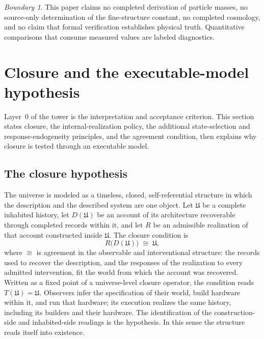 \documentclass[11pt]{article}
\theoremstyle{definition}
\theoremstyle{remark}
\newtheorem{boundary}[theorem]{Boundary}
\begin{document}
\begin{boundary}
This paper claims no completed derivation of particle masses, no source-only
determination of the fine-structure constant, no completed cosmology, and no
claim that formal verification establishes physical truth. Quantitative
comparisons that consume measured values are labeled diagnostics.
\end{boundary}

\section{Closure and the executable-model hypothesis}
\label{sec:strange-loop}

Layer~0 of the tower is the interpretation and acceptance criterion. This
section states closure, the internal-realization policy, the additional
state-selection and response-endogeneity principles, and the agreement
condition, then explains why closure is tested through an executable model.

\subsection{The closure hypothesis}

The universe is modeled as a timeless, closed, self-referential structure in which the description and the described system are one object.
Let $\mathfrak U$ be a complete inhabited history, let $D(\mathfrak U)$ be an
account of its architecture recoverable through completed records within it,
and let $R$ be an admissible realization of that account constructed inside
$\mathfrak U$. The closure condition is
\begin{equation}
R\bigl(D(\mathfrak U)\bigr)\;\cong\;\mathfrak U ,
\label{eq:closure-condition}
\end{equation}
where $\cong$ is agreement in the observable and interventional structure:
the records used to recover the description, and the responses of the
realization to every admitted intervention, fit the world from which the
account was recovered. Written as a fixed point of a
universe-level closure operator, the condition reads
$T(\mathfrak U)=\mathfrak U$. Observers infer the specification of their
world, build hardware within it, and run that hardware; its execution
realizes the same history, including its builders and their hardware. The
identification of the construction-side and inhabited-side readings is the
hypothesis. In this sense the structure reads itself into existence.
\end{document}
